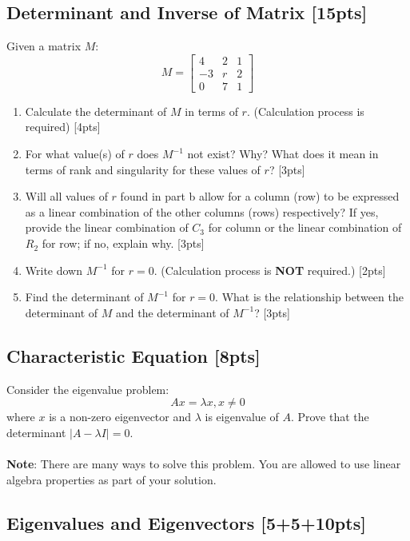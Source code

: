 \documentclass{article}
\begin{document}
\subsection{Determinant and Inverse of Matrix [15pts]}
Given a matrix $M$:
$$M = \begin{bmatrix} 
    4 & 2 & 1 \\ 
    -3 & r & 2 \\
    0 & 7 & 1
\end{bmatrix}$$
\begin{enumerate}[label=(\alph*)]
    \item Calculate the determinant of $M$ in terms of $r$. (Calculation process is required) [4pts]
    
    \item For what value(s) of $r$ does $M^{-1}$ not exist? Why? What does it mean in terms of rank and singularity for these values of $r$? [3pts]
    
    \item Will all values of $r$ found in part b allow for a column (row) to be expressed as a linear combination of the other columns (rows) respectively? If yes, provide the linear combination of $C_3$ for column or the linear combination of $R_2$ for row; if no, explain why. [3pts]
    
    \item Write down $M^{-1}$ for $r = 0$. (Calculation process is \textbf{NOT} required.) [2pts]
    
    \item Find the determinant of $M^{-1}$ for $r = 0$. What is the relationship between the determinant of $M$ and the determinant of $M^{-1}$? [3pts]
\end{enumerate}


\newpage
\subsection{Characteristic Equation [8pts]}
Consider the eigenvalue problem: 
$$Ax =\lambda x, x \neq 0$$
where $x$ is a non-zero eigenvector and $\lambda$ is eigenvalue of $A$. Prove that the determinant $|A-\lambda I|= 0$.\\ \\
\textbf{Note}: There are many ways to solve this problem. You are allowed to use linear algebra properties as part of your solution. \\
\newline


\newpage
\subsection{Eigenvalues and Eigenvectors [5+5+10pts]}
\end{document}
